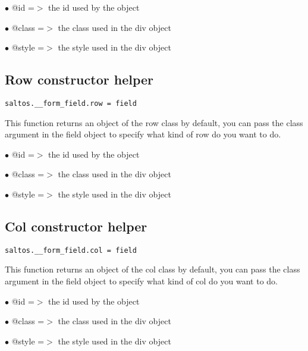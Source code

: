 \documentclass[a4paper]{book}
\begin{document}
\begin{compactitem}
\item[\color{myblue}$\bullet$] @id    =$>$ the id used by the object
\item[\color{myblue}$\bullet$] @class =$>$ the class used in the div object
\item[\color{myblue}$\bullet$] @style =$>$ the style used in the div object
\end{compactitem}

\hypertarget{toc372}{}
\subsection{Row constructor helper}

\begin{lstlisting}
saltos.__form_field.row = field
\end{lstlisting}

This function returns an object of the row class by default, you can pass the class argument
in the field object to specify what kind of row do you want to do.

\begin{compactitem}
\item[\color{myblue}$\bullet$] @id    =$>$ the id used by the object
\item[\color{myblue}$\bullet$] @class =$>$ the class used in the div object
\item[\color{myblue}$\bullet$] @style =$>$ the style used in the div object
\end{compactitem}

\hypertarget{toc373}{}
\subsection{Col constructor helper}

\begin{lstlisting}
saltos.__form_field.col = field
\end{lstlisting}

This function returns an object of the col class by default, you can pass the class argument
in the field object to specify what kind of col do you want to do.

\begin{compactitem}
\item[\color{myblue}$\bullet$] @id    =$>$ the id used by the object
\item[\color{myblue}$\bullet$] @class =$>$ the class used in the div object
\item[\color{myblue}$\bullet$] @style =$>$ the style used in the div object
\end{compactitem}
\end{document}
